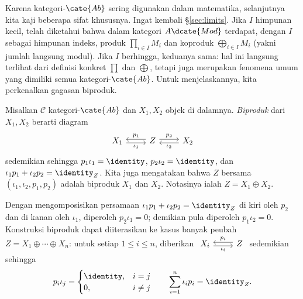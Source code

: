 Karena kategori-$\cate{Ab}$ sering digunakan dalam matematika, selanjutnya kita kaji beberapa sifat khususnya. Ingat kembali \S\ref{sec:limits}. Jika $I$ himpunan kecil, telah diketahui bahwa dalam kategori $A\dcate{Mod}$ terdapat, dengan $I$ sebagai himpunan indeks, produk $\prod_{i \in I} M_i$ dan koproduk $\bigoplus_{i \in I} M_i$ (yakni jumlah langsung modul). Jika $I$ berhingga, keduanya sama: hal ini langsung terlihat dari definisi konkret $\prod$ dan $\bigoplus$, tetapi juga merupakan fenomena umum yang dimiliki semua kategori-$\cate{Ab}$. Untuk menjelaskannya, kita perkenalkan gagasan biproduk.

\begin{definition}\label{def:biproduct}
	Misalkan $\mathcal{C}$ kategori-$\cate{Ab}$ dan $X_1, X_2$ objek di dalamnya. \emph{Biproduk} dari $X_1, X_2$ berarti diagram
	\[ \begin{tikzcd}
		X_1 \arrow[r, yshift=-0.5ex, "\iota_1"'] & Z \arrow[l, yshift=0.5ex, "p_1"'] \arrow[r, yshift=0.5ex, "p_2"] & X_2 \arrow[l, yshift=-0.5ex, "\iota_2"]
	\end{tikzcd} \]
	sedemikian sehingga $p_1 \iota_1 = \identity$, $p_2 \iota_2 = \identity$, dan $\iota_1 p_1 + \iota_2 p_2 = \identity_Z$. Kita juga mengatakan bahwa $Z$ bersama $(\iota_1, \iota_2, p_1, p_2)$ adalah biproduk $X_1$ dan $X_2$. Notasinya ialah $Z = X_1 \oplus X_2$.
\end{definition}
Dengan mengomposisikan persamaan $\iota_1 p_1 + \iota_2 p_2 = \identity_Z$ di kiri oleh $p_2$ dan di kanan oleh $\iota_1$, diperoleh $p_2 \iota_1 = 0$; demikian pula diperoleh $p_1 \iota_2 = 0$. Konstruksi biproduk dapat diiterasikan ke kasus banyak peubah $Z = X_1 \oplus \cdots \oplus X_n$: untuk setiap $1 \leq i \leq n$, diberikan $\begin{tikzcd} X_i \arrow[r, yshift=-0.5ex, "\iota_i"'] & Z \arrow[l, yshift=0.5ex, "p_i"'] \end{tikzcd}$ sedemikian sehingga
\begin{gather*}
	p_i \iota_j = \begin{cases} \identity, & i=j \\ 0, & i \neq j \end{cases} \qquad
	\sum_{i=1}^n \iota_i p_i = \identity_Z.
\end{gather*}

